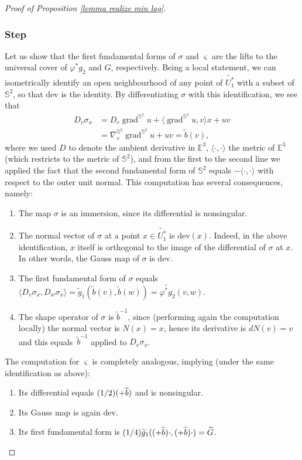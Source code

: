 \documentclass[11pt]{article}
\makeatletter
\newcounter{steps}
\newcommand{\step}{\refstepcounter{steps}\subsubsection*{Step \thesteps}}
\DeclareRobustCommand{\mathbbm}[1]{\csname jepbb@#1\endcsname}
\theoremstyle{definition}
\newcommand{\E}{\mathbb{E}}
\newcommand{\dev}{\mathrm{dev}}
\DeclareMathOperator{\grad}{grad}
\makeatother
\begin{document}
\begin{proof}[Proof of Proposition \ref{lemma realize min lag}]
\step\label{step:1}
Let us show that the first fundamental forms of $\sigma$ and $ \varsigma$ are the lifts to the universal cover of $\varphi^*g_2$ and $G$, respectively.
Being a local statement, we can isometrically identify an open neighbourhood of any point of $\widetilde {U_1^*}$ with a subset of $\mathbb S^2$, so that $\dev$ is the identity. By differentiating $\sigma$ with this identification, we see that
\begin{align*}
D_v \sigma_x&=D_v\grad^{\mathbb S^2}\!\! u+\langle \grad^{\mathbb S^2}\!\!u,v\rangle x+uv \\
&=\nabla^{\mathbb S^2}_v\!\grad^{\mathbb S^2}\!\! u+uv=\widetilde b(v),
\end{align*}
where we used $D$ to denote the ambient derivative in $\E^3$, $\langle\cdot,\cdot\rangle$ the metric of $\E^3$ (which restricts to the metric of $\mathbb S^2$), and from the first to the second line we applied the fact that the second fundamental form of $\mathbb S^2$ equals $-\langle\cdot,\cdot\rangle$ with respect to the outer unit normal. This computation has several consequences, namely:
\begin{enumerate}
\item\label{enum:1} The map $ \sigma$ is an immersion, since its differential is nonsingular.
\item\label{enum:2} The normal vector of $ \sigma$ at a point $x\in \widetilde{U_1^*}$ is $\dev(x)$. Indeed, in the above identification, $x$ itself is orthogonal to the image of the differential of $\sigma$ at $x$. In other words, the Gauss map of $ \sigma$ is $\dev$.
\item\label{enum:3} The first fundamental form of $ \sigma$ equals
$\langle D_v\sigma_x,D_w\sigma_x\rangle=\widetilde g_1( \widetilde b(v),\widetilde b(w))=\widetilde{\varphi^*g_2}(v,w)$.
\item\label{enum:4} The shape operator of $ \sigma$ is $\widetilde b^{-1}$, since (performing again the computation local\-ly) the normal vector is $N(x)=x$, hence its derivative is $dN(v)=v$ and this equals~$\widetilde b^{-1}$ applied to $D_v\sigma_x$.
\end{enumerate}
The computation for $\varsigma$ is completely analogous, implying (under the same identification as above):
\begin{enumerate}\renewcommand{\theenumi}{\arabic{enumi}$'$}
\item\label{enum:1'}
Its differential equals $(1/2)(\mathbbm 1+\widetilde b)$ and is nonsingular.
\item\label{enum:2'}
Its Gauss map is again $\dev$.
\item\label{enum:3'}
Its first fundamental form is $(1/4)\widetilde g_1((\mathbbm 1+ \widetilde b)\cdot,(\mathbbm 1+ \widetilde b)\cdot)=\widetilde G$.
\end{enumerate}


\end{proof}
\end{document}
